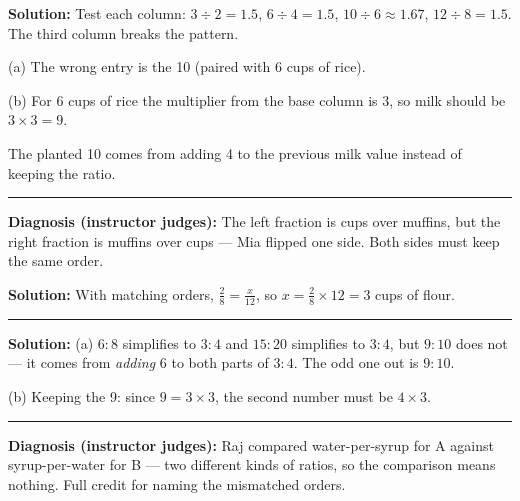\documentclass[12pt]{article}
\begin{document}
\textbf{Solution:} Test each column: $3 \div 2 = 1.5$, $6 \div 4 = 1.5$,
$10 \div 6 \approx 1.67$, $12 \div 8 = 1.5$. The third column breaks the
pattern.

(a) The wrong entry is the 10 (paired with 6 cups of rice).

(b) For 6 cups of rice the multiplier from the base column is 3, so milk should
be $3 \times 3 = 9$. 

The planted 10 comes from adding 4 to the previous milk value instead of
keeping the ratio.

\vspace{0.3cm}\noindent\rule{\linewidth}{0.2pt}\vspace{0.3cm}


\textbf{Diagnosis (instructor judges):} The left fraction is cups over muffins,
but the right fraction is muffins over cups — Mia flipped one side. Both sides
must keep the same order.

\textbf{Solution:} With matching orders, $\frac{2}{8} = \frac{x}{12}$, so
$x = \frac{2}{8} \times 12 = 3$ cups of flour. 

\vspace{0.3cm}\noindent\rule{\linewidth}{0.2pt}\vspace{0.3cm}


\textbf{Solution:} (a) $6{:}8$ simplifies to $3{:}4$ and $15{:}20$ simplifies to
$3{:}4$, but $9{:}10$ does not — it comes from \emph{adding} 6 to both parts of
$3{:}4$. The odd one out is $9{:}10$.

(b) Keeping the 9: since $9 = 3 \times 3$, the second number must be
$4 \times 3$. 

\vspace{0.3cm}\noindent\rule{\linewidth}{0.2pt}\vspace{0.3cm}


\textbf{Diagnosis (instructor judges):} Raj compared water-per-syrup for A
against syrup-per-water for B — two different kinds of ratios, so the
comparison means nothing. Full credit for naming the mismatched orders.
\end{document}
